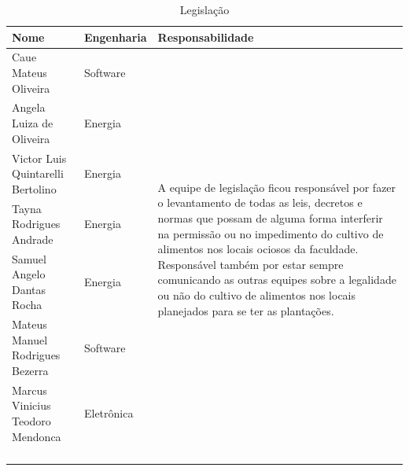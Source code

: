 \begin{anexosenv}
  \begin{table}[!htb]
    \centering
    \begin{tabular}{p{7cm}p{}p{}}
      \toprule
        \textbf{Nome} & \textbf{Engenharia} & \textbf{Responsabilidade} \\
      \midrule
        Caue Mateus Oliveira               & Software       & \multirow{8}{6,5cm}{A equipe de legislação ficou responsável por fazer o
                                                              levantamento de todas as leis, decretos e normas que possam de alguma forma
                                                              interferir na permissão ou no impedimento do cultivo de alimentos nos locais
                                                              ociosos da faculdade. Responsável também por estar sempre comunicando as
                                                              outras equipes sobre a legalidade ou não do cultivo de alimentos nos locais
                                                              planejados para se ter as plantações.} \\ \cmidrule(r){1-2}
        Angela Luiza de Oliveira           & Energia        & \\ \cmidrule(r){1-2}
        Victor Luis Quintarelli Bertolino  & Energia        & \\ \cmidrule(r){1-2}
        Tayna Rodrigues Andrade            & Energia        & \\ \cmidrule(r){1-2}
        Samuel Angelo Dantas Rocha         & Energia        & \\ \cmidrule(r){1-2}
        Mateus Manuel Rodrigues Bezerra    & Software       & \\ \cmidrule(r){1-2}
        Marcus Vinicius Teodoro Mendonca   & Eletr\^{o}nica & \\ \\ \\ \\ \\
      \bottomrule
    \end{tabular}
    \caption{Legislação}
  \end{table}


\end{anexosenv}
